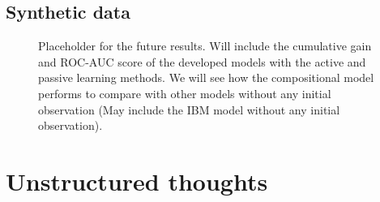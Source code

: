 \documentclass{article}
\begin{document}
\subsection{Synthetic data}
\begin{figure}[t]
	\centering
	
	\caption{Placeholder for the future results. Will include the cumulative gain and ROC-AUC score of the developed models with the active and passive learning methods. We will see how the compositional model performs to compare with other models without any initial observation (May include the IBM model without any initial observation).}
\end{figure}

\section{Unstructured thoughts}
\end{document}

